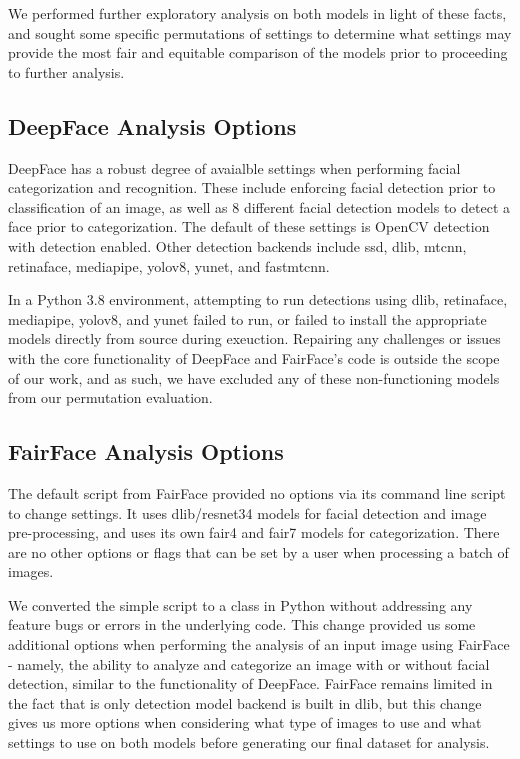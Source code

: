 \documentclass[
  letterpaper,
  DIV=11,
  numbers=noendperiod]{scrreprt}
\begin{document}
We performed further exploratory analysis on both models in light of
these facts, and sought some specific permutations of settings to
determine what settings may provide the most fair and equitable
comparison of the models prior to proceeding to further analysis.

\hypertarget{deepface-analysis-options}{%
\subsection{DeepFace Analysis Options}\label{deepface-analysis-options}}

DeepFace has a robust degree of avaialble settings when performing
facial categorization and recognition. These include enforcing facial
detection prior to classification of an image, as well as 8 different
facial detection models to detect a face prior to categorization. The
default of these settings is OpenCV detection with detection enabled.
Other detection backends include ssd, dlib, mtcnn, retinaface,
mediapipe, yolov8, yunet, and fastmtcnn.

In a Python 3.8 environment, attempting to run detections using dlib,
retinaface, mediapipe, yolov8, and yunet failed to run, or failed to
install the appropriate models directly from source during exeuction.
Repairing any challenges or issues with the core functionality of
DeepFace and FairFace's code is outside the scope of our work, and as
such, we have excluded any of these non-functioning models from our
permutation evaluation.

\hypertarget{fairface-analysis-options}{%
\subsection{FairFace Analysis Options}\label{fairface-analysis-options}}

The default script from FairFace provided no options via its command
line script to change settings. It uses dlib/resnet34 models for facial
detection and image pre-processing, and uses its own fair4 and fair7
models for categorization. There are no other options or flags that can
be set by a user when processing a batch of images.

We converted the simple script to a class in Python without addressing
any feature bugs or errors in the underlying code. This change provided
us some additional options when performing the analysis of an input
image using FairFace - namely, the ability to analyze and categorize an
image with or without facial detection, similar to the functionality of
DeepFace. FairFace remains limited in the fact that is only detection
model backend is built in dlib, but this change gives us more options
when considering what type of images to use and what settings to use on
both models before generating our final dataset for analysis.
\end{document}
